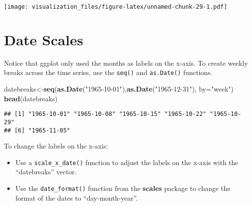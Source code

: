 \documentclass[oneside]{memoir}
\newenvironment{Shaded}{\begin{snugshade}}{\end{snugshade}}
\newcommand{\KeywordTok}[1]{\textcolor[rgb]{0.13,0.29,0.53}{\textbf{#1}}}
\newcommand{\DataTypeTok}[1]{\textcolor[rgb]{0.13,0.29,0.53}{#1}}
\newcommand{\DecValTok}[1]{\textcolor[rgb]{0.00,0.00,0.81}{#1}}
\newcommand{\StringTok}[1]{\textcolor[rgb]{0.31,0.60,0.02}{#1}}
\newcommand{\OperatorTok}[1]{\textcolor[rgb]{0.81,0.36,0.00}{\textbf{#1}}}
\newcommand{\NormalTok}[1]{#1}
\theoremstyle{definition}
\theoremstyle{definition}
\theoremstyle{definition}
\theoremstyle{remark}
\begin{document}
\texttt{[image: visualization\_files/figure-latex/unnamed-chunk-29-1.pdf]}

\section{Date Scales}\label{date-scales}

Notice that ggplot only used the months as labels on the x-axis. To
create weekly breaks across the time series, use the \texttt{seq()} and
\texttt{as.Date()} functions.

\begin{Shaded}
\begin{Highlighting}[]
\NormalTok{datebreaks<-}\KeywordTok{seq}\NormalTok{(}\KeywordTok{as.Date}\NormalTok{(}\StringTok{"1965-10-01"}\NormalTok{),}\KeywordTok{as.Date}\NormalTok{(}\StringTok{"1965-12-31"}\NormalTok{), }\DataTypeTok{by=}\StringTok{"week"}\NormalTok{)}
\KeywordTok{head}\NormalTok{(datebreaks)}
\end{Highlighting}
\end{Shaded}

\begin{verbatim}
## [1] "1965-10-01" "1965-10-08" "1965-10-15" "1965-10-22" "1965-10-29"
## [6] "1965-11-05"
\end{verbatim}

To change the labels on the x-axis:

\begin{itemize}
\item
  Use a \texttt{scale\_x\_date()} function to adjust the labels on the
  x-axis with the ``datebreaks'' vector.
\item
  Use the \texttt{date\_format()} function from the \textbf{scales}
  package to change the format of the dates to ``day-month-year''.
\end{itemize}

\begin{Shaded}
\end{Shaded}
\end{document}
